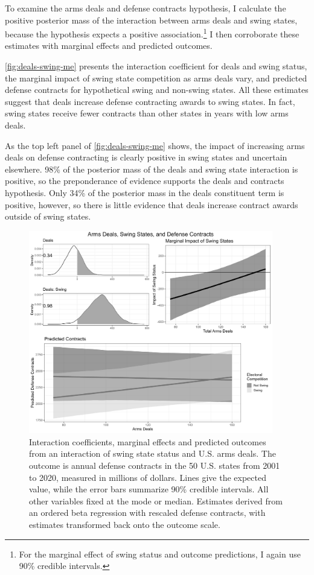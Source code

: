 \documentclass[12pt]{article}
\begin{document}
To examine the arms deals and defense contracts hypothesis, I calculate the positive posterior mass of the interaction between arms deals and swing states, because the hypothesis expects a positive association.\footnote{For the marginal effect of swing status and outcome predictions, I again use 90\% credible intervals.}
I then corroborate these estimates with marginal effects and predicted outcomes.


\autoref{fig:deals-swing-me} presents the interaction coefficient for deals and swing status, the marginal impact of swing state competition as arms deals vary, and predicted defense contracts for hypothetical swing and non-swing states. 
All these estimates suggest that deals increase defense contracting awards to swing states. 
In fact, swing states receive fewer contracts than other states in years with low arms deals. 


As the top left panel of \autoref{fig:deals-swing-me} shows, the impact of increasing arms deals on defense contracting is clearly positive in swing states and uncertain elsewhere.
98\% of the posterior mass of the deals and swing state interaction is positive, so the preponderance of evidence supports the deals and contracts hypothesis.
Only 34\% of the posterior mass in the deals constituent term is positive, however, so there is little evidence that deals increase contract awards outside of swing states. 


\begin{figure}[htpb]
	\centering
		\includegraphics[width=0.95\textwidth]{../figures/deals-swing-me.png}
	\caption{Interaction coefficients, marginal effects and predicted outcomes from an interaction of swing state status and U.S. arms deals. The outcome is annual defense contracts in the 50 U.S. states from 2001 to 2020, measured in millions of dollars. Lines give the expected value, while the error bars summarize 90\% credible intervals. All other variables fixed at the mode or median. Estimates derived from an ordered beta regression with rescaled defense contracts, with estimates transformed back onto the outcome scale.}
	\label{fig:deals-swing-me}
\end{figure}
\end{document}
